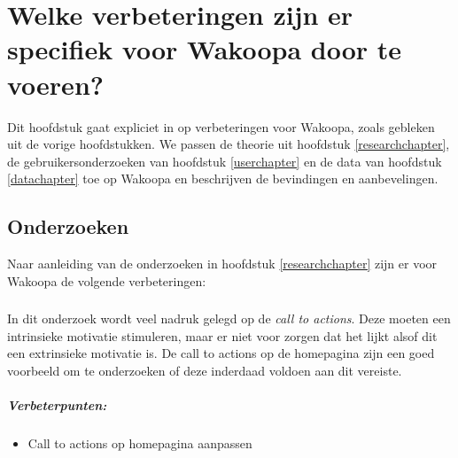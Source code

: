 \documentclass[a4paper, 10pt, pdftex]{report}
\begin{document}
  \newpage
  \chapter{Welke verbeteringen zijn er specifiek voor Wakoopa door te voeren?}
    \newpage

    Dit hoofdstuk gaat expliciet in op verbeteringen voor Wakoopa, zoals gebleken uit de vorige hoofdstukken. We passen de theorie uit hoofdstuk \ref{researchchapter}, de gebruikersonderzoeken van hoofdstuk \ref{userchapter} en de data van hoofdstuk \ref{datachapter} toe op Wakoopa en beschrijven de bevindingen en aanbevelingen.

    \section{Onderzoeken}
    Naar aanleiding van de onderzoeken in hoofdstuk \ref{researchchapter} zijn er voor Wakoopa de volgende verbeteringen:

 \subsection{\cite{Beenen2004}}
      In dit onderzoek wordt veel nadruk gelegd op de \emph{call to actions}. Deze moeten een intrinsieke motivatie stimuleren, maar er niet voor zorgen dat het lijkt alsof dit een extrinsieke motivatie is. De call to actions op de homepagina zijn een goed voorbeeld om te onderzoeken of deze inderdaad voldoen aan dit vereiste.

      \paragraph{\textbf{Verbeterpunten:}}
      \begin{itemize}
        \item Call to actions op homepagina aanpassen
      \end{itemize}
\end{document}
